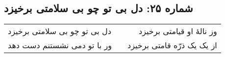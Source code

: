 \begin{center}
\section*{شماره ۲۵: دل بی تو چو بی سلامتی برخیزد}
\label{sec:025}
\begin{longtable}{l p{0.5cm} r}
دل بی تو چو بی سلامتی برخیزد
&&
وز نالهٔ او قیامتی برخیزد
\\
ور با تو دمی نشستنم دست دهد
&&
از یک یک ذرّه قامتی برخیزد
\\
\end{longtable}
\end{center}

